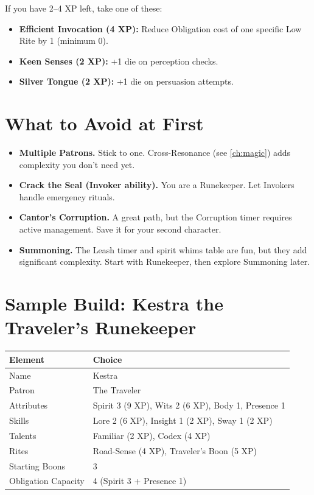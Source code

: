 If you have 2--4 XP left, take one of these:

\begin{itemize}
  \item \textbf{Efficient Invocation (4 XP):} Reduce Obligation cost of one specific Low Rite by 1 (minimum 0).
  \item \textbf{Keen Senses (2 XP):} +1 die on perception checks.
  \item \textbf{Silver Tongue (2 XP):} +1 die on persuasion attempts.
\end{itemize}

\section{What to Avoid at First}
\label{sec:avoid-first}

\begin{itemize}
  \item \textbf{Multiple Patrons.} Stick to one. Cross-Resonance (see \ref{ch:magic}) adds complexity you don't need yet.
  \item \textbf{Crack the Seal (Invoker ability).} You are a Runekeeper. Let Invokers handle emergency rituals.
  \item \textbf{Cantor's Corruption.} A great path, but the Corruption timer requires active management. Save it for your second character.
  \item \textbf{Summoning.} The Leash timer and spirit whims table are fun, but they add significant complexity. Start with Runekeeper, then explore Summoning later.
\end{itemize}

\section{Sample Build: Kestra the Traveler's Runekeeper}
\label{sec:sample-build}

\begin{center}
\small
\renewcommand{\arraystretch}{1.1}
\begin{tabular}{ll}
\toprule
\textbf{Element} & \textbf{Choice} \\
\midrule
Name & Kestra \\
Patron & The Traveler \\
Attributes & Spirit 3 (9 XP), Wits 2 (6 XP), Body 1, Presence 1 \\
Skills & Lore 2 (6 XP), Insight 1 (2 XP), Sway 1 (2 XP) \\
Talents & Familiar (2 XP), Codex (4 XP) \\
Rites & Road-Sense (4 XP), Traveler's Boon (5 XP) \\
Starting Boons & 3 \\
Obligation Capacity & 4 (Spirit 3 + Presence 1) \\
\bottomrule
\end{tabular}
\end{center}

